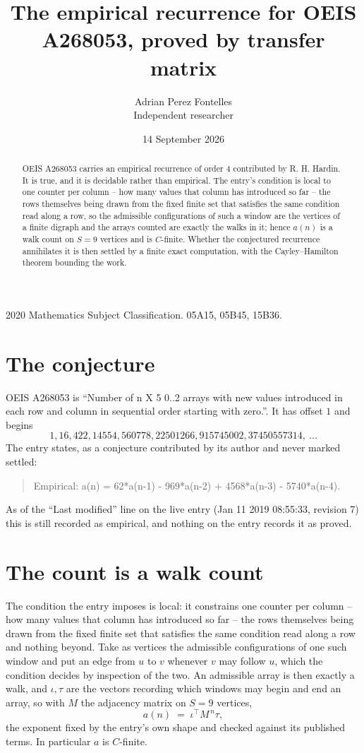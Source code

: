 \documentclass[11pt,a4paper]{article}
\title{The empirical recurrence for OEIS A268053, proved by transfer matrix}
\author{Adrian Perez Fontelles\\ \small Independent researcher}
\date{14 September 2026}
\theoremstyle{plain}
\theoremstyle{definition}
\begin{document}
\maketitle

\begin{abstract}
OEIS A268053 carries an empirical recurrence of order $4$ contributed by R. H. Hardin. It is
true, and it is decidable rather than empirical. The entry's condition is local to one counter per column -- how many values that column has introduced so far -- the rows themselves being drawn from the fixed finite set that satisfies the same condition read along a row, so
the admissible configurations of such a window are the vertices of a finite digraph and the
arrays counted are exactly the walks in it; hence $a(n)$ is a walk count on $S=9$ vertices
and is $C$-finite. Whether the conjectured recurrence annihilates it is then settled by a
finite exact computation, with the Cayley--Hamilton theorem bounding the work.
\end{abstract}

\noindent\small 2020 Mathematics Subject Classification. 05A15, 05B45, 15B36.\normalsize

\section{The conjecture}

OEIS A268053 is ``Number of n X 5 0..2 arrays with new values introduced in each row and column in sequential order starting with zero.''. It has offset $1$ and begins
\[
1, 16, 422, 14554, 560778, 22501266, 915745002, 37450557314,\ \dots
\]
The entry states, as a conjecture contributed by its author and never marked settled:
\begin{quote}
Empirical: a(n) = 62*a(n-1) - 969*a(n-2) + 4568*a(n-3) - 5740*a(n-4).
\end{quote}
As of the ``Last modified'' line on the live entry (Jan 11 2019 08:55:33, revision 7) this is still
recorded as empirical, and nothing on the entry records it as proved.

\section{The count is a walk count}

The condition the entry imposes is local: it constrains one counter per column -- how many values that column has introduced so far -- the rows themselves being drawn from the fixed finite set that satisfies the same condition read along a row and nothing beyond. Take as vertices the admissible configurations of one such window and put an edge from $u$ to $v$ whenever $v$ may follow $u$, which the condition decides by inspection of the two.
An admissible array is then exactly a walk, and $\iota,\tau$ are the vectors recording which windows may begin and end an array, so with $M$ the adjacency matrix on $S=9$ vertices,
\[
a(n)\;=\;\iota^{\!\top}M^{\,n}\tau ,
\]
the exponent fixed by the entry's own shape and checked against its published terms. In
particular $a$ is $C$-finite.
\end{document}
